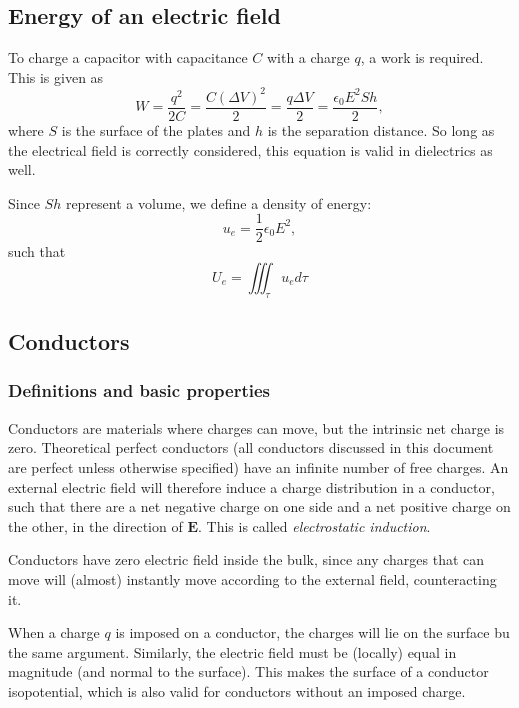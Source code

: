 \documentclass[a4paper, 12pt]{article}
\renewcommand{\vec}[1]{\bm{#1}}
\newcommand{\E}{\ensuremath{\vec{E}}}
\newcommand{\e}{\ensuremath{\epsilon_0}}
\begin{document}
\subsection{Energy of an electric field}
    To charge a capacitor with capacitance $C$ with a charge $q$, a work is required. This is given as 
    \begin{equation}
        W = \frac{q^2}{2C} = \frac{C(\Delta V)^2}{2} = \frac{q\Delta V}{2} = \frac{\e E^2S h}{2},
    \end{equation}
    where $S$ is the surface of the plates and $h$ is the separation distance. 
    So long as the electrical field is correctly considered, this equation is valid in dielectrics as well.
    
    Since $S h$ represent a volume, we define a density of energy: 
    \begin{equation}
        u_e = \frac{1}{2}\e E^2, 
    \end{equation}
    such that 
    \begin{equation}
        U_e = \iiint_\tau u_e d\tau
    \end{equation}
    
\subsection{Conductors}
    \subsubsection{Definitions and basic properties}
        Conductors are materials where charges can move, but the intrinsic net charge is zero. 
        Theoretical perfect conductors (all conductors discussed in this document are perfect unless otherwise specified) 
        have an infinite number of free charges. 
        An external electric field will therefore induce a charge distribution in a conductor, 
        such that there are a net negative charge on one side and a net positive charge on the other, 
        in the direction of $\E$. This is called \textit{electrostatic induction}.
        
        Conductors have zero electric field inside the bulk, 
        since any charges that can move will (almost) instantly move according to the external field, counteracting it. 
        
        When a charge $q$ is imposed on a conductor, the charges will lie on the surface bu the same argument. 
        Similarly, the electric field must be (locally) equal in magnitude (and normal to the surface). 
        This makes the surface of a conductor isopotential, which is also valid for conductors without an imposed charge. 
\end{document}
